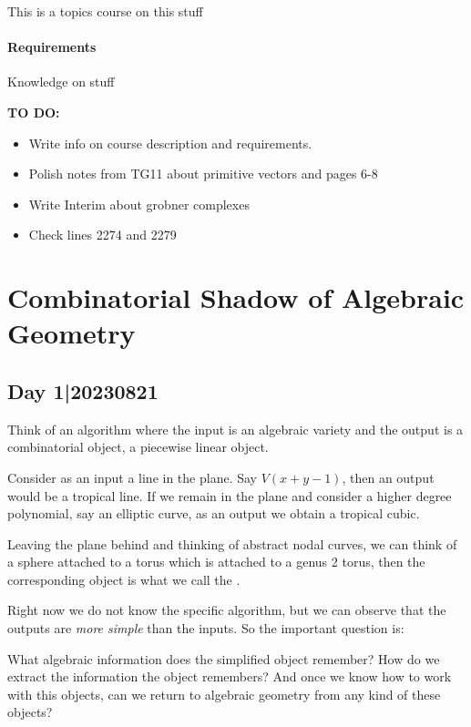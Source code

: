 \documentclass[12pt]{memoir}
\theoremstyle{definition}
\begin{document}
\maketitle
{\small 
\setlength{\parindent}{0em}
\setlength{\parskip}{1em}

This is a topics course on this stuff

\subsubsection*{Requirements}
Knowledge on stuff\par 

\textbf{TO DO:}
\begin{itemize}
    \item Write info on course description and requirements.
    \item Polish notes from TG11 about primitive vectors and pages 6-8
    \item Write Interim about grobner complexes
    \item Check lines 2274 and 2279
\end{itemize}
}
\newpage
\tableofcontents
\chapter{Combinatorial Shadow of Algebraic Geometry}

\section{Day 1|20230821}

Think of an algorithm where the input is an algebraic variety and the output is a combinatorial object, a piecewise linear object.

\begin{Ex}
    Consider as an input a line in the plane. Say $V(x+y-1)$, then an output would be a tropical line. If we remain in the plane and consider a higher degree polynomial, say an elliptic curve, as an output we obtain a tropical cubic.\par 
    Leaving the plane behind and thinking of abstract nodal curves, we can think of a sphere attached to a torus which is attached to a genus 2 torus, then the corresponding object is what we call the .
\end{Ex}

Right now we do not know the specific algorithm, but we can observe that the outputs are \emph{more simple} than the inputs. So the important question is:
\begin{significant}
What algebraic information does the simplified object remember? How do we extract the information the object remembers? And once we know how to work with this objects, can we return to algebraic geometry from any kind of these objects?
\end{significant}
\end{document}

